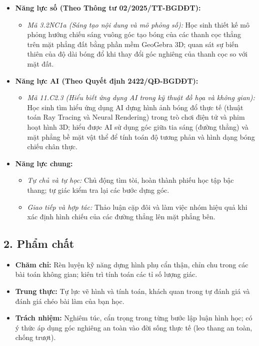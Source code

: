 \documentclass[12pt, a4paper]{article}
\begin{document}
\begin{itemize}[leftmargin=1.2cm]
    \item \textbf{Năng lực số (Theo Thông tư 02/2025/TT-BGDĐT):}
    \begin{itemize}[leftmargin=0.6cm]
        \item \textit{Mã 3.2NC1a (Sáng tạo nội dung và mô phỏng số):} Học sinh thiết kế mô phỏng hướng chiếu sáng vuông góc tạo bóng của các thanh cọc thẳng trên mặt phẳng đất bằng phần mềm GeoGebra 3D; quan sát sự biến thiên của độ dài bóng đổ khi thay đổi góc nghiêng của thanh cọc so với mặt đất.
    \end{itemize}

    \item \textbf{Năng lực AI (Theo Quyết định 2422/QĐ-BGDĐT):}
    \begin{itemize}[leftmargin=0.6cm]
        \item \textit{Mã 11.C2.3 (Hiểu biết ứng dụng AI trong kỹ thuật đồ họa và không gian):} Học sinh tìm hiểu ứng dụng AI dựng hình ảnh bóng đổ thực tế (thuật toán Ray Tracing và Neural Rendering) trong trò chơi điện tử và phim hoạt hình 3D; hiểu được AI sử dụng góc giữa tia sáng (đường thẳng) và mặt phẳng bề mặt vật thể để tính toán độ tương phản và hình dạng bóng chiếu chân thực.
    \end{itemize}

    \item \textbf{Năng lực chung:}
    \begin{itemize}[leftmargin=0.6cm]
        \item \textit{Tự chủ và tự học:} Chủ động tìm tòi, hoàn thành phiếu học tập bậc thang; tự giác kiểm tra lại các bước dựng góc.
        \item \textit{Giao tiếp và hợp tác:} Thảo luận cặp đôi và làm việc nhóm hiệu quả khi xác định hình chiếu của các đường thẳng lên mặt phẳng bên.
    \end{itemize}
\end{itemize}

\subsection*{2. Phẩm chất}

\begin{itemize}[leftmargin=1.2cm]
    \item \textbf{Chăm chỉ:} Rèn luyện kỹ năng dựng hình phụ cẩn thận, chỉn chu trong các bài toán không gian; kiên trì tính toán các tỉ số lượng giác.
    \item \textbf{Trung thực:} Tự lực vẽ hình và tính toán, khách quan trong tự đánh giá và đánh giá chéo bài làm của bạn học.
    \item \textbf{Trách nhiệm:} Nghiêm túc, cẩn trọng trong từng bước lập luận hình học; có ý thức áp dụng góc nghiêng an toàn vào đời sống thực tế (leo thang an toàn, chống trượt).
\end{itemize}
\end{document}
